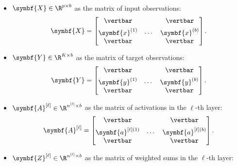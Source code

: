 \documentclass{article}
\begin{document}
\begin{itemize}
    \item \(\symbf{X} \in \R^{p \times b}\) as the matrix of input
          observations:
          \begin{equation*}
              \symbf{X} =
              \begin{bmatrix}
                  \vertbar                     &        & \vertbar                     \\[1ex]
                  \symbf{x}^{\left( 1 \right)} & \cdots & \symbf{x}^{\left( b \right)} \\
                  \vertbar                     &        & \vertbar
              \end{bmatrix}
              .
          \end{equation*}
    \item \(\symbf{Y} \in \R^{K \times b}\) as the matrix of target
          observations:
          \begin{equation*}
              \symbf{Y} =
              \begin{bmatrix}
                  \vertbar                     &        & \vertbar                     \\[1ex]
                  \symbf{y}^{\left( 1 \right)} & \cdots & \symbf{y}^{\left( b \right)} \\
                  \vertbar                     &        & \vertbar
              \end{bmatrix}
              .
          \end{equation*}
    \item \(\symbf{A}^{\left[ \ell \right]} \in \R^{n^{\left[ \ell \right]} \times b}\) as the matrix of activations in the \(\ell\)-th layer:
          \begin{equation*}
              \symbf{A}^{\left[ \ell \right]} =
              \begin{bmatrix}
                  \vertbar                                         &        & \vertbar                                         \\[1ex]
                  \symbf{a}^{\left[ \ell \right] \left( 1 \right)} & \cdots & \symbf{a}^{\left[ \ell \right] \left( b \right)} \\
                  \vertbar                                         &        & \vertbar
              \end{bmatrix}
              .
          \end{equation*}
    \item \(\symbf{Z}^{\left[ \ell \right]} \in \R^{n^{\left[ \ell \right]} \times b}\) as the matrix of weighted sums in the \(\ell\)-th layer:

\end{itemize}
\end{document}
